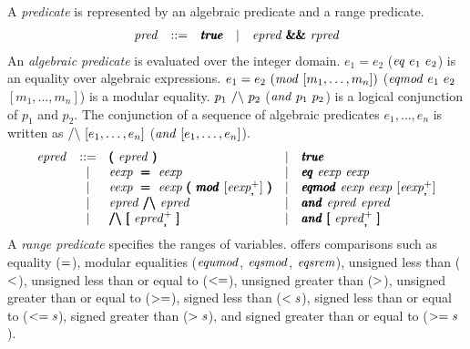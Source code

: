 \documentclass{article}
\begin{document}
A \emph{predicate} is represented by an algebraic predicate and a range predicate.
\[
\begin{array}{rclcl}
\mathit{pred} &  ::= & \pmb{\mathit{true}}
      & \mid & \mathit{epred}\ \pmb{\&\&}\ \mathit{rpred}
\end{array}
\]
An \emph{algebraic predicate} is evaluated over the integer domain.
$e_1 = e_2$ ($\mathit{eq}\ e_1\ e_2$) is an equality over algebraic
expressions.
$e_1 = e_2\ (\imod\ [m_1, \ldots, m_n])$ ($\ieqmod\ e_1\ e_2$ $[m_1,
\ldots, m_n]$) is a modular equality.
$p_1\ \mathit{/\backslash}\ p_2$ ($\mathit{and}\ p_1\ p_2$) is a logical conjunction of
$p_1$ and $p_2$.
The conjunction of a sequence of algebraic predicates $e_1, \ldots,
e_n$ is written as $\mathit{/\backslash}\ [e_1, \ldots, e_n]$ ($\mathit{and}\ [e_1, \ldots,
e_n]$).
\[
\begin{array}{rclcl}
  \epred &  ::= & \pmb(\ \epred\ \pmb)
  & \mid & \pmb\true \\
         & \mid & \eexp\ \pmb\eqop\ \eexp
  & \mid & \pmb\ieq\ \eexp\ \eexp \\
         & \mid & \eexp\ \pmb\eqop\ \eexp\ \pmb(\ \pmb\imod\ [\eexp_{\pmb,}^+]\ \pmb)
  & \mid & \pmb\ieqmod\ \eexp\ \eexp\ [ \eexp_{\pmb,}^+ ] \\
         & \mid & \epred\ \pmb\landop\ \epred
  & \mid & \pmb\iand\ \epred\ \epred \\
         & \mid & \pmb\landop\ \pmb[\ \epred_{\pmb,}^+\ \pmb]
  & \mid & \pmb\iand\ \pmb[\ \epred_{\pmb,}^+\ \pmb] \\
\end{array}
\]
A \emph{range predicate} specifies the ranges of variables.
\cryptoline offers comparisons such as equality ($=$), modular
equalities ($\mathit{equmod}$, $\mathit{eqsmod}$, $\mathit{eqsrem}$), unsigned less than
($\mathit{<}$), unsigned less than or equal to ($\mathit{<=}$), unsigned
greater than ($\mathit{>}$), unsigned greater than or equal to ($\mathit{>=}$),
signed less than ($\mathit{<s}$), signed less than or equal to ($\mathit{<=s}$),
signed greater than ($\mathit{>s}$), and signed greater than or equal to
($\mathit{>=s}$).
\end{document}

